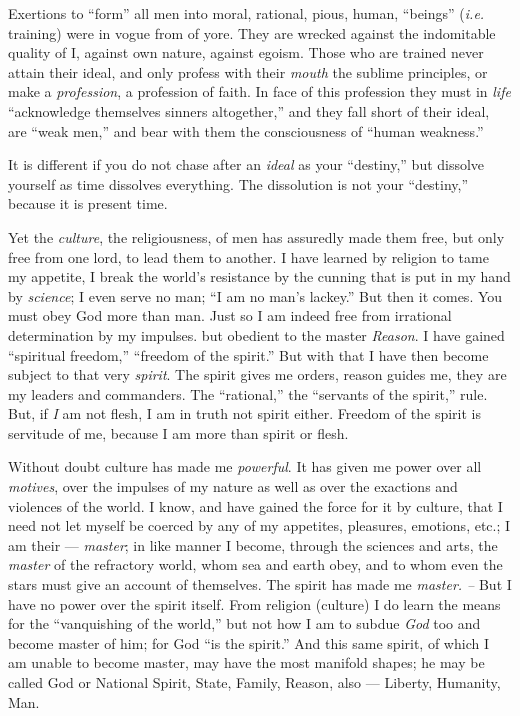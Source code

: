 Exertions to ``form'' all men into moral, rational, pious, human, 
``beings'' (\textit{i.e.} training) were in vogue from of yore. They are 
wrecked against the indomitable quality of I, against own nature, against 
egoism. Those who are trained never attain their ideal, and only profess with 
their \textit{mouth} the sublime principles, or make a \textit{profession}, a 
profession of faith. In face of this profession they must in \textit{life} 
``acknowledge themselves sinners altogether,'' and they fall short of their 
ideal, are ``weak men,'' and bear with them the consciousness of ``human 
weakness.''

It is different if you do not chase after an \textit{ideal} as your 
``destiny,'' but dissolve yourself as time dissolves everything. The 
dissolution is not your ``destiny,'' because it is present time.

Yet the \textit{culture}, the religiousness, of men has assuredly made them 
free, but only free from one lord, to lead them to another. I have learned by 
religion to tame my appetite, I break the world's resistance by the cunning 
that is put in my hand by \textit{science}; I even serve no man; ``I am no 
man's lackey.'' But then it comes. You must obey God more than man. Just so I 
am indeed free from irrational determination by my impulses. but obedient to 
the master \textit{Reason}. I have gained ``spiritual freedom,'' ``freedom 
of the spirit.'' But with that I have then become subject to that very 
\textit{spirit}. The spirit gives me orders, reason guides me, they are my 
leaders and commanders. The ``rational,'' the ``servants of the spirit,'' 
rule. But, if \textit{I} am not flesh, I am in truth not spirit either. 
Freedom of the spirit is servitude of me, because I am more than spirit or 
flesh.

Without doubt culture has made me \textit{powerful}. It has given me power 
over all \textit{motives}, over the impulses of my nature as well as over the 
exactions and violences of the world. I know, and have gained the force for it 
by culture, that I need not let myself be coerced by any of my appetites, 
pleasures, emotions, etc.; I am their --- \textit{master}; in like manner I 
become, through the sciences and arts, the \textit{master} of the refractory 
world, whom sea and earth obey, and to whom even the stars must give an 
account of themselves. The spirit has made me \textit{master. --} But I have 
no power over the spirit itself. From religion (culture) I do learn the means 
for the ``vanquishing of the world,'' but not how I am to subdue 
\textit{God} too and become master of him; for God ``is the spirit.'' And 
this same spirit, of which I am unable to become master, may have the most 
manifold shapes; he may be called God or National Spirit, State, Family, 
Reason, also --- Liberty, Humanity, Man.

